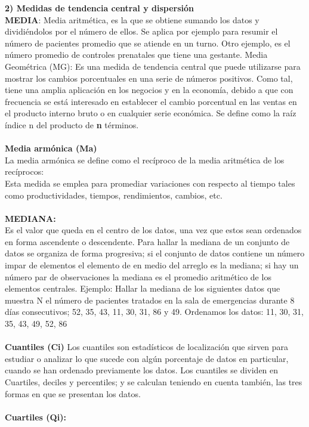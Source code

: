 \documentclass[ebook,12pt,oneside,openany]{memoir}
\begin{document}
\textbf{2) Medidas de tendencia central y dispersión}\\
\textbf{MEDIA}: Media aritmética, es la que se obtiene sumando los datos y dividiéndolos por el número de
ellos. Se aplica por ejemplo para resumir el número de pacientes promedio que se atiende en un
turno. Otro ejemplo, es el número promedio de controles prenatales que tiene una gestante.
Media Geométrica (MG): Es una medida de tendencia central que puede utilizarse para mostrar los
cambios porcentuales en una serie de números positivos. Como tal, tiene una amplia aplicación en
los negocios y en la economía, debido a que con frecuencia se está interesado en establecer el
cambio porcentual en las ventas en el producto interno bruto o en cualquier serie económica. Se
define como la raíz índice n del producto de \textbf{n} términos.\\
\\\textbf{Media armónica (Ma)}\\
La media armónica se define como el recíproco de la \verb||media aritmética de los recíprocos:\\
Esta medida se emplea para promediar variaciones con respecto al tiempo tales como
productividades, tiempos, rendimientos, cambios, etc.\\
\\\textbf{MEDIANA:}\\
Es el valor que queda en el centro de los datos, una vez que estos sean ordenados en
forma ascendente o descendente. Para hallar la mediana de un conjunto de datos se organiza de
forma progresiva; si el conjunto de datos contiene un número impar de elementos el elemento de en
medio del arreglo es la mediana; si hay un número par de observaciones la mediana es el promedio
aritmético de los elementos centrales.
Ejemplo: Hallar la mediana de los siguientes datos que muestra N el número de pacientes tratados
en la sala de emergencias durante 8 días consecutivos; 52, 35, 43, 11, 30, 31, 86 y 49.
Ordenamos los datos: 11, 30, 31, 35, 43, 49, 52, 86\\
\\\textbf{Cuantiles (Ci)}
Los cuantiles son estadísticos de localización que sirven para estudiar o analizar lo que sucede con
algún porcentaje de datos en particular, cuando se han ordenado previamente los datos. Los
cuantiles se dividen en Cuartiles, deciles y percentiles; y se calculan teniendo en cuenta también, las
tres formas en que se presentan los datos.\\
\\\textbf{Cuartiles (Qi):}
\end{document}
